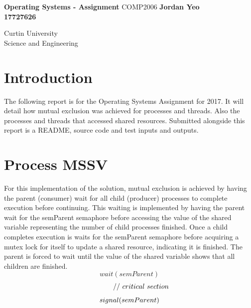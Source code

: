 \documentclass[]{article}
\begin{document}

\begin{titlepage}
	\begin{center}
		\vspace*{1cm}
		\LARGE\textbf{Operating Systems - Assignment}
		\break
		COMP2006
		\vspace{1cm}
		\break
		\Large\textbf{Jordan Yeo \\17727626} 
		\vspace{3cm}

		
		\vspace{14.0cm}
		\normalsize
		Curtin University \\
		Science and Engineering \\
		
	\end{center}
\end{titlepage}

\tableofcontents
\pagebreak


\section*{Introduction}
The following report is for the Operating Systems Assignment for 2017. It will detail how mutual exclusion was achieved for processes and threads. Also the processes and threads that accessed shared resources. Submitted alongside this report is a README, source code and test inputs and outputs.

\section{Process MSSV}
For this implementation of the solution, mutual exclusion is achieved by having the parent (consumer) wait for all child (producer) processes to complete execution before continuing. This waiting is implemented by having the parent wait for the semParent semaphore before accessing the value of the shared variable representing the number of child processes finished. Once a child completes execution is waits for the semParent semaphore before acquiring a mutex lock for itself to update a shared resource, indicating it is finished. The parent is forced to wait until the value of the shared variable shows that all children are finished. 
$$
wait(semParent)
$$
$$
\ \ \ \ \ \ \ \ \ \ //\ critical\ section\\ 
$$
$$
signal(semParent)\\ \\
$$
\vspace{0.1cm}
\end{document}

